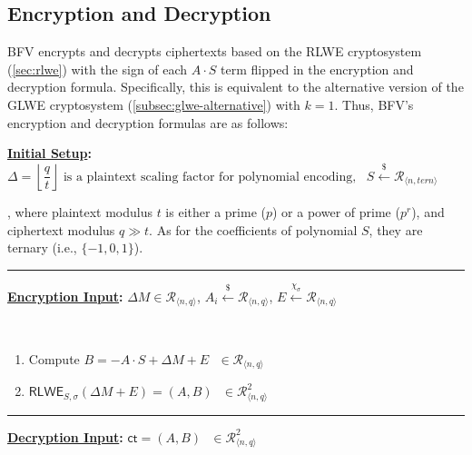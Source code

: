 \subsection{Encryption and Decryption}
\label{subsec:bfv-enc-dec}

BFV encrypts and decrypts ciphertexts based on the RLWE cryptosystem (\autoref{sec:rlwe}) with the sign of each $A\cdot S$ term flipped in the encryption and decryption formula. Specifically, this is equivalent to the alternative version of the GLWE cryptosystem (\autoref{subsec:glwe-alternative}) with $k = 1$. Thus, BFV's encryption and decryption formulas are as follows: 



\begin{tcolorbox}[title={\textbf{\tboxlabel{\ref*{subsec:bfv-enc-dec}} BFV Encryption and Decryption}}]

\textbf{\underline{Initial Setup}:} $\Delta=\left\lfloor\dfrac{q}{t}\right\rfloor \text{ is a plaintext scaling factor for polynomial encoding}, \text{ } S \xleftarrow{\$} \mathcal{R}_{\langle n, \textit{tern} \rangle}$

, where plaintext modulus $t$ is either a prime ($p$) or a power of prime ($p^r$), and ciphertext modulus $q \gg t$. As for the coefficients of polynomial $S$, they are ternary (i.e., $\{-1, 0, 1\}$).

\par\noindent\rule{\textwidth}{0.4pt}

\textbf{\underline{Encryption Input}:} $\Delta M \in \mathcal{R}_{\langle n, q \rangle}$, $A_i \xleftarrow{\$} \mathcal{R}_{\langle n, q \rangle}$, $E \xleftarrow{\chi_\sigma} \mathcal{R}_{\langle n, q \rangle}$


$ $

\begin{enumerate}


\item Compute $B = -A \cdot S + \Delta M + E \text{ } \in \mathcal{R}_{\langle n,q \rangle}$

\item $\textsf{RLWE}_{S,\sigma}(\Delta M + E) = (A, B) \text{ } \in \mathcal{R}_{\langle n,q \rangle}^2$ 

\end{enumerate}

\par\noindent\rule{\textwidth}{0.4pt}

\textbf{\underline{Decryption Input}:} $\textsf{ct} = (A, B) \text{ } \in \mathcal{R}_{\langle n,q \rangle}^2$ 


\end{tcolorbox}

